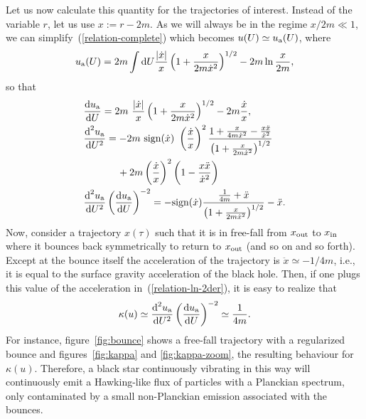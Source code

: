 \documentclass[12pt]{article}
\newcommand{\diff}{\text{d}}
\begin{document}
Let us now calculate this quantity for the trajectories of interest. Instead of
the variable $r$, let us use $x:= r-2m$. As we will always be in the regime
$x/2m\ll 1$, we can simplify~(\ref{relation-complete}) which becomes $u(U) \simeq u_{\rm a} (U)$, where
%
\begin{align}
u_{\rm a}(U) = 2m \int   \diff U{|\dot x| \over x} \left(1 + {x \over 2m \dot x^2}\right)^{1/2} -2m\ln {x \over 2m},
\label{relation-ln}
\end{align}
%
so that
%
\begin{align}
&{\diff u_{\rm a} \over \diff U}= 2m~ {|\dot x| \over x} \left(1 + {x \over 2m \dot x^2}\right)^{1/2} -2m {\dot x \over x},
\label{relation-ln-1der}\\
&{\diff^2 u_{\rm a}  \over \diff U^2}= -2m~{\rm sign}(\dot x)~\left({\dot x \over x}\right)^2 {1 + {x \over 4m \dot x^2}- {x \ddot x \over \dot x^2} \over \left(1 + {x \over 2m \dot x^2}\right)^{1/2}}
\nonumber\\
&
\hspace{1.2 cm} +2m \left({\dot x \over x}\right)^2 \left( 1- {x \ddot x \over \dot x^2} \right)
\nonumber\\
&{\diff^2 u_{\rm a} \over \diff U^2} \left({\diff u_{\rm a} \over \diff U} \right)^{-2} = - {\rm sign}(\dot x){{1 \over 4m} + \ddot x \over \left(1 + {x \over 2m \dot x^2}\right)^{1/2}}  - \ddot x.
\label{relation-ln-2der}
\end{align}
%
Now, consider a trajectory $x(\tau)$ such that it is in free-fall from $x_{\rm
out}$ to $x_{\rm in}$ where it bounces back symmetrically to return to $x_{\rm
out}$ (and so on and so forth). Except at the bounce itself the acceleration of
the trajectory is $\ddot x \simeq -1/4m$, i.e., it is equal to the surface
gravity acceleration of the black hole. Then, if one plugs this value of the
acceleration in~(\ref{relation-ln-2der}), it is easy to realize that 
%
\begin{equation}
\kappa (u) \simeq {\diff^2 u_{\rm a} \over \diff U^2} \left({\diff u_{\rm a} \over \diff U}\right)^{-2} \simeq {1 \over 4m}. 
\end{equation}
%
 For instance, figure~\ref{fig:bounce}  shows a free-fall trajectory with a regularized bounce and figures~\ref{fig:kappa} and \ref{fig:kappa-zoom}, the resulting behaviour for $\kappa(u)$. Therefore, a black star continuously vibrating in this way will continuously emit a Hawking-like flux of particles with a Planckian spectrum, only contaminated by a small non-Planckian
emission associated with the bounces.
\end{document}
